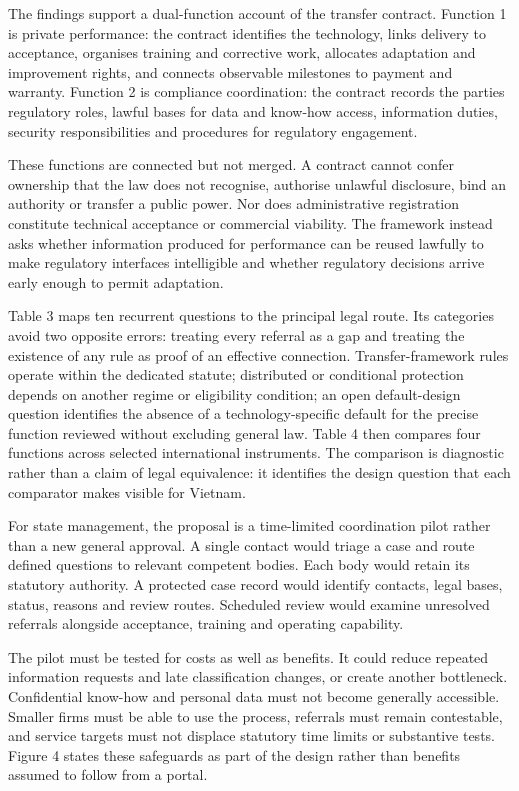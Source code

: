 \documentclass[
]{article}
\begin{document}
The findings support a dual-function account of the transfer contract.
Function 1 is private performance: the contract identifies the
technology, links delivery to acceptance, organises training and
corrective work, allocates adaptation and improvement rights, and
connects observable milestones to payment and warranty. Function 2 is
compliance coordination: the contract records the
parties\textquotesingle{} regulatory roles, lawful bases for data and
know-how access, information duties, security responsibilities and
procedures for regulatory engagement.

These functions are connected but not merged. A contract cannot confer
ownership that the law does not recognise, authorise unlawful
disclosure, bind an authority or transfer a public power. Nor does
administrative registration constitute technical acceptance or
commercial viability. The framework instead asks whether information
produced for performance can be reused lawfully to make regulatory
interfaces intelligible and whether regulatory decisions arrive early
enough to permit adaptation.

Table 3 maps ten recurrent questions to the principal legal route. Its
categories avoid two opposite errors: treating every referral as a gap
and treating the existence of any rule as proof of an effective
connection. Transfer-framework rules operate within the dedicated
statute; distributed or conditional protection depends on another regime
or eligibility condition; an open default-design question identifies the
absence of a technology-specific default for the precise function
reviewed without excluding general law. Table 4 then compares four
functions across selected international instruments. The comparison is
diagnostic rather than a claim of legal equivalence: it identifies the
design question that each comparator makes visible for Vietnam.

For state management, the proposal is a time-limited coordination pilot
rather than a new general approval. A single contact would triage a case
and route defined questions to relevant competent bodies. Each body
would retain its statutory authority. A protected case record would
identify contacts, legal bases, status, reasons and review routes.
Scheduled review would examine unresolved referrals alongside
acceptance, training and operating capability.

The pilot must be tested for costs as well as benefits. It could reduce
repeated information requests and late classification changes, or create
another bottleneck. Confidential know-how and personal data must not
become generally accessible. Smaller firms must be able to use the
process, referrals must remain contestable, and service targets must not
displace statutory time limits or substantive tests. Figure 4 states
these safeguards as part of the design rather than benefits assumed to
follow from a portal.
\end{document}

